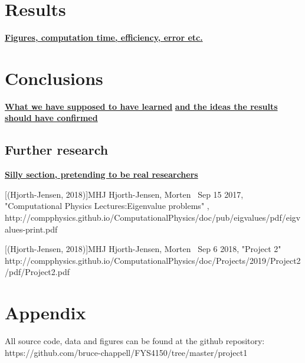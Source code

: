 \documentclass{emulateapj}
\begin{document}
\section{Results}
\label{sec:results}

\underline{\textbf{Figures, computation time, efficiency, error etc.}}

\section{Conclusions}
\label{sec:conclusions}
\underline{\textbf{What we have supposed to have learned}}
\underline{\textbf{and the ideas the results should have confirmed}}


\pagebreak

\subsection{Further research}

\underline{\textbf{Silly section, pretending to be real researchers}}

\begin{thebibliography}{}
[(Hjorth-Jensen, 2018)]{MHJ} Hjorth-Jensen, Morten \, Sep 15 2017, "Computational Physics Lectures:Eigenvalue problems" , http://compphysics.github.io/ComputationalPhysics/doc/pub/eigvalues/pdf/eigvalues-print.pdf

[(Hjorth-Jensen, 2018)]{MHJ} Hjorth-Jensen, Morten \, Sep 6 2018, "Project 2"
http://compphysics.github.io/ComputationalPhysics/doc/Projects/2019/Project2/pdf/Project2.pdf

\end{thebibliography}

\section{Appendix}
All source code, data and figures can be found at the github repository: https://github.com/bruce-chappell/FYS4150/tree/master/project1
\end{document}
